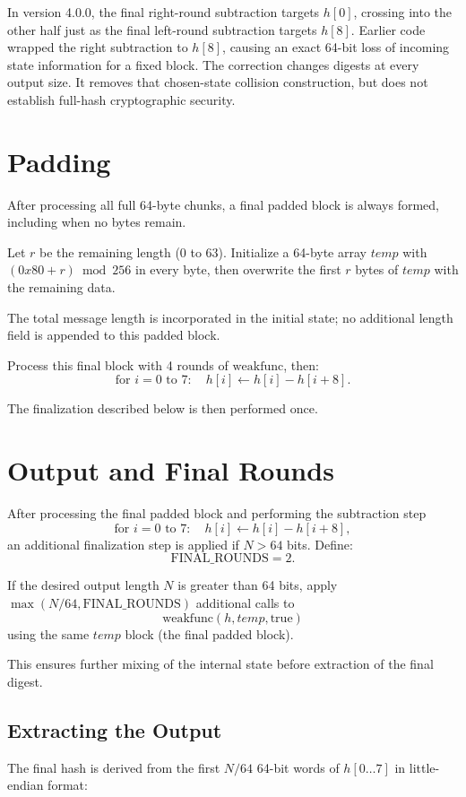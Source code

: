\documentclass[11pt,a4paper]{article}
\begin{document}
In version 4.0.0, the final right-round subtraction targets $h[0]$, crossing
into the other half just as the final left-round subtraction targets $h[8]$.
Earlier code wrapped the right subtraction to $h[8]$, causing an exact
64-bit loss of incoming state information for a fixed block. The correction
changes digests at every output size. It removes that chosen-state collision
construction, but does not establish full-hash cryptographic security.

\section*{Padding}
After processing all full 64-byte chunks, a final padded block is always formed,
including when no bytes remain.

Let $r$ be the remaining length (0 to 63). Initialize a 64-byte array $temp$ with $(0x80 + r) \bmod 256$ in every byte, then overwrite the first $r$ bytes of $temp$ with the remaining data.

The total message length is incorporated in the initial state; no additional
length field is appended to this padded block.

Process this final block with 4 rounds of $\text{weakfunc}$, then:
\[
\text{for } i=0 \text{ to } 7:\quad h[i] \leftarrow h[i] - h[i+8].
\]

The finalization described below is then performed once.

\section*{Output and Final Rounds}
After processing the final padded block and performing the subtraction step
\[
\text{for } i=0 \text{ to } 7:\quad h[i] \leftarrow h[i] - h[i+8],
\]
an additional finalization step is applied if $N > 64$ bits. Define:
\[
\text{FINAL\_ROUNDS} = 2.
\]

If the desired output length $N$ is greater than 64 bits, apply $\max(N/64, \text{FINAL\_ROUNDS})$ additional calls to
\[
\text{weakfunc}(h, temp, \text{true})
\]
using the same $temp$ block (the final padded block).

This ensures further mixing of the internal state before extraction of the final digest.

\subsection*{Extracting the Output}
The final hash is derived from the first $N/64$ 64-bit words of $h[0 \ldots 7]$ in little-endian format:
\end{document}
